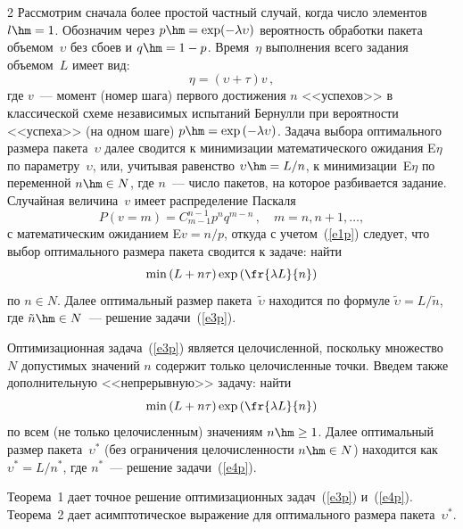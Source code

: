 \begin{multicols}{2}
     Рассмотрим сначала более простой частный случай, когда число 
элементов $l\hm=1$. Обозначим через $p\hm=\exp (-\lambda \upsilon)$ 
вероятность обработки пакета объемом~$\upsilon$ без сбоев и $q\hm=1-p$. 
Время~$\eta$ выполнения всего задания объемом~$L$ имеет вид:
     \begin{equation}
     \eta=(\upsilon+\tau) v\,,
     \label{e1p}
     \end{equation}
где $v$~--- момент (номер шага) первого достижения $n$ <<успехов>> в 
классической схеме независимых ис\-пытаний Бернулли при вероятности 
<<успеха>> (на\linebreak
одном шаге) $p\hm=\exp\left( -\lambda \upsilon\right)$. Задача 
выбора оп\-тимального размера пакета~$\upsilon$ далее сводится к 
минимизации математического ожидания E$\eta$ по параметру~$\upsilon$, 
или, учитывая равенство $\upsilon\hm= L/n$, к\linebreak
 минимизации~E$\eta$ по 
переменной $n\hm\in N$, где $n$~---  чис\-ло пакетов, на которое разбивается 
задание. Случайная величина~$v$ имеет распределение Пас\-каля 
\begin{equation}
P\left( v=m\right) = C_{m-1}^{n-1} p^n q^{m-n}\,,\quad m=n, n+1, \ldots ,
\label{e2p}
\end{equation}
с математическим ожиданием E$v=n/p$, откуда с учетом~(\ref{e1p}) следует, 
что выбор оптимального размера пакета сводится к задаче: найти
\begin{equation}
\min \left( L+n\tau\right)\exp\left( \fr{\lambda L}{n}\right)
\label{e3p}
\end{equation}
по $n\in N$. Далее оптимальный размер пакета~$\tilde{\upsilon}$ 
находится по формуле $\tilde{\upsilon} =L/\tilde{n}$, где $\tilde{n}\hm\in 
N$~--- решение задачи~(\ref{e3p}). 
     
     Оптимизационная задача~(\ref{e3p}) является цело\-чис\-лен\-ной, 
поскольку множество $N$ допустимых значений $n$ содержит только 
целочисленные точки. Введем также дополнительную <<непрерывную>> 
задачу: найти
     \begin{equation}
     \min\left( L+n\tau\right) \exp \left( \fr{\lambda L}{n}\right)
     \label{e4p}
     \end{equation}
по всем (не только целочисленным) значениям $n\hm\geq 1$. Далее 
оптимальный размер пакета~$\upsilon^*$ (без ограничения целочисленности 
$n\hm\in N$) находится как $\upsilon^*=L/n^*$, где $n^*$~--- решение 
задачи~(\ref{e4p}).
     
Теорема~1 дает точное решение оптимизационных 
задач~(\ref{e3p}) и~(\ref{e4p}). Теорема~2 дает асимптотическое выражение 
для оптимального размера пакета~$\upsilon^*$.
     

\end{multicols}
